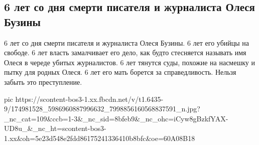  
 
 
 
 
\subsection{6 лет со дня смерти писателя и журналиста Олеся Бузины}

6 лет со дня смерти писателя и журналиста Олеся Бузины. 
6 лет его убийцы на свободе. 
6 лет власть замалчивает его дело, как будто стесняется называть имя Олеся в череде убитых журналистов. 
6 лет тянутся суды, похожие на насмешку и пытку для родных Олеся. 
6 лет его мать борется за справедливость. 
Нельзя забыть это преступление.

\ifcmt
  pic https://scontent-bos3-1.xx.fbcdn.net/v/t1.6435-9/174981528_5986960887996632_7998856160568837591_n.jpg?_nc_cat=109&ccb=1-3&_nc_sid=8bfeb9&_nc_ohc=iCyw8gBzkfYAX-UD8u_&_nc_ht=scontent-bos3-1.xx&oh=5e23d548e2fdd86175241336410b8bfc&oe=60A08B18
\fi

